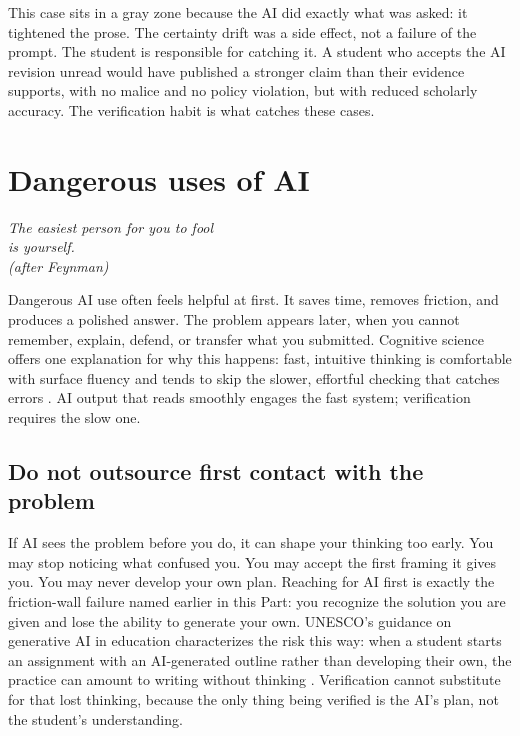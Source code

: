 \documentclass{SIAMbook2023}
\newcommand{\bookepigraph}[1]{%
  \begin{center}%
    \begin{minipage}{0.78\textwidth}%
      \centering\itshape #1%
    \end{minipage}%
  \end{center}%
  \vspace{0.6em}%
}
\begin{document}
This case sits in a gray zone because the AI did exactly what was asked: it tightened the prose. The certainty drift was a side effect, not a failure of the prompt. The student is responsible for catching it. A student who accepts the AI revision unread would have published a stronger claim than their evidence supports, with no malice and no policy violation, but with reduced scholarly accuracy. The verification habit is what catches these cases.

\section{Dangerous uses of AI}
\label{sec:dangerous-uses}%

\bookepigraph{The easiest person for you to fool\\is yourself.\\[0.6em]\normalfont\footnotesize (after Feynman)}

Dangerous AI use often feels helpful at first. It saves time, removes friction, and produces a polished answer. The problem appears later, when you cannot remember, explain, defend, or transfer what you submitted. Cognitive science offers one explanation for why this happens: fast, intuitive thinking is comfortable with surface fluency and tends to skip the slower, effortful checking that catches errors \citep{kahneman2011thinking}. AI output that reads smoothly engages the fast system; verification requires the slow one.

\subsection{Do not outsource first contact with the problem}
\label{subsec:outsource-first-contact}%

If AI sees the problem before you do, it can shape your thinking too early. You may stop noticing what confused you. You may accept the first framing it gives you. You may never develop your own plan. Reaching for AI first is exactly the friction-wall failure named earlier in this Part: you recognize the solution you are given and lose the ability to generate your own. UNESCO's guidance on generative AI in education characterizes the risk this way: when a student starts an assignment with an AI-generated outline rather than developing their own, the practice can amount to writing without thinking \citep{miao2023guidance}. Verification cannot substitute for that lost thinking, because the only thing being verified is the AI's plan, not the student's understanding.
\end{document}
